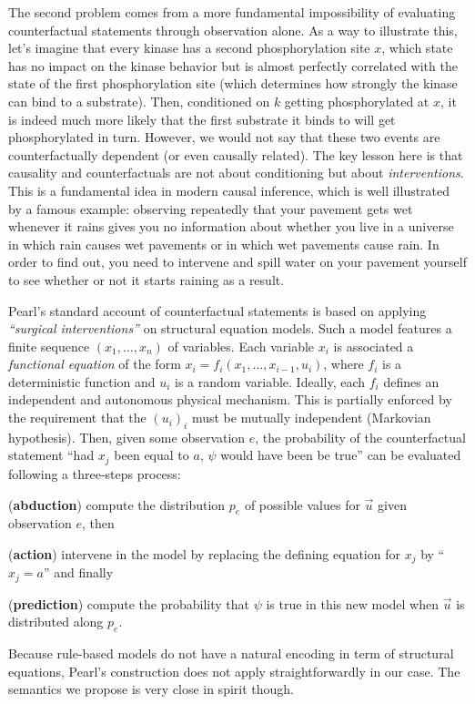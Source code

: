 The second problem comes from a more fundamental impossibility of
evaluating counterfactual statements through observation alone. As a
way to illustrate this, let's imagine that every kinase has a second
phosphorylation site $x$, which state has no impact on the kinase
behavior but is almost perfectly correlated with the state of the
first phosphorylation site (which determines how strongly the kinase
can bind to a substrate). Then, conditioned on $k$ getting
phosphorylated at $x$, it is indeed much more likely that the first
substrate it binds to will get phosphorylated in turn. However, we
would not say that these two events are counterfactually dependent (or
even causally related). The key lesson here is that causality and
counterfactuals are not about conditioning but about
\emph{interventions}. This is a fundamental idea in modern causal
inference, which is well illustrated by a famous example: observing
repeatedly that your pavement gets wet whenever it rains gives you no
information about whether you live in a universe in which rain causes
wet pavements or in which wet pavements cause rain. In order to find
out, you need to intervene and spill water on your pavement yourself
to see whether or not it starts raining as a result.

Pearl's standard account of counterfactual statements is based on
applying \textit{``surgical interventions''} on structural equation
models. Such a model features a finite sequence $(x_1, \dots, x_n)$ of
variables. Each variable $x_i$ is associated a \emph{functional
  equation} of the form $x_i = f_i(x_1, \dots, x_{i-1}, u_i)$, where
$f_i$ is a deterministic function and $u_i$ is a random
variable. Ideally, each $f_i$ defines an independent and autonomous
physical mechanism. This is partially enforced by the requirement that
the $(u_i)_i$ must be mutually independent (Markovian
hypothesis). Then, given some observation $e$, the probability of the
counterfactual statement ``had $x_j$ been equal to $a$, $\psi$ would
have been be true'' can be evaluated following a three-steps process:
\begin{inparaenum}[]
\item (\textbf{abduction}) compute the distribution $p_e$ of possible values for
  $\vec u$ given observation $e$, then
\item (\textbf{action}) intervene in the model by replacing the
  defining equation for $x_j$ by ``$x_j = a$'' and finally
\item (\textbf{prediction}) compute the probability that $\psi$ is true in this
  new model when $\vec{u}$ is distributed along $p_e$.
\end{inparaenum}
Because rule-based models do not have a natural encoding in term of
structural equations, Pearl's construction does not apply
straightforwardly in our case. The semantics we propose is
very close in spirit though.



